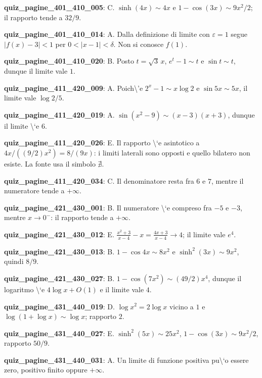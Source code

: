 \documentclass[11pt,a4paper]{article}
\newcounter{quiz}
\begin{document}
\noindent\textbf{quiz\_pagine\_401\_410\_005}: C. $\sinh(4x)\sim4x$ e $1-\cos(3x)\sim9x^2/2$; il rapporto tende a $32/9$.\par\medskip
\noindent\textbf{quiz\_pagine\_401\_410\_014}: A. Dalla definizione di limite con $\varepsilon=1$ segue $|f(x)-3|<1$ per $0<|x-1|<\delta$. Non si conosce $f(1)$.\par\medskip
\noindent\textbf{quiz\_pagine\_401\_410\_020}: B. Posto $t=\sqrt3\,x$, $e^t-1\sim t$ e $\sin t\sim t$, dunque il limite vale $1$.\par\medskip
\noindent\textbf{quiz\_pagine\_411\_420\_009}: A. Poich\textbackslash{}'e $2^x-1\sim x\log2$ e $\sin5x\sim5x$, il limite vale $\log2/5$.\par\medskip
\noindent\textbf{quiz\_pagine\_411\_420\_019}: A. $\sin(x^2-9)\sim(x-3)(x+3)$, dunque il limite \textbackslash{}`e $6$.\par\medskip
\noindent\textbf{quiz\_pagine\_411\_420\_026}: E. Il rapporto \textbackslash{}`e asintotico a $4x/((9/2)x^2)=8/(9x)$: i limiti laterali sono opposti e quello bilatero non esiste. La fonte usa il simbolo $\nexists$.\par\medskip
\noindent\textbf{quiz\_pagine\_411\_420\_034}: C. Il denominatore resta fra $6$ e $7$, mentre il numeratore tende a $+\infty$.\par\medskip
\noindent\textbf{quiz\_pagine\_421\_430\_001}: B. Il numeratore \textbackslash{}`e compreso fra $-5$ e $-3$, mentre $x\to0^-$: il rapporto tende a $+\infty$.\par\medskip
\noindent\textbf{quiz\_pagine\_421\_430\_012}: E. $\frac{x^2+3}{x-4}-x=\frac{4x+3}{x-4}\to4$; il limite vale $e^4$.\par\medskip
\noindent\textbf{quiz\_pagine\_421\_430\_013}: B. $1-\cos4x\sim8x^2$ e $\sinh^2(3x)\sim9x^2$, quindi $8/9$.\par\medskip
\noindent\textbf{quiz\_pagine\_421\_430\_027}: B. $1-\cos(7x^2)\sim(49/2)x^4$, dunque il logaritmo \textbackslash{}`e $4\log x+O(1)$ e il limite vale $4$.\par\medskip
\noindent\textbf{quiz\_pagine\_431\_440\_019}: D. $\log x^2=2\log x$ vicino a $1$ e $\log(1+\log x)\sim\log x$; rapporto $2$.\par\medskip
\noindent\textbf{quiz\_pagine\_431\_440\_027}: E. $\sinh^2(5x)\sim25x^2$, $1-\cos(3x)\sim9x^2/2$, rapporto $50/9$.\par\medskip
\noindent\textbf{quiz\_pagine\_431\_440\_031}: A. Un limite di funzione positiva pu\textbackslash{}`o essere zero, positivo finito oppure $+\infty$.\par\medskip
\end{document}
